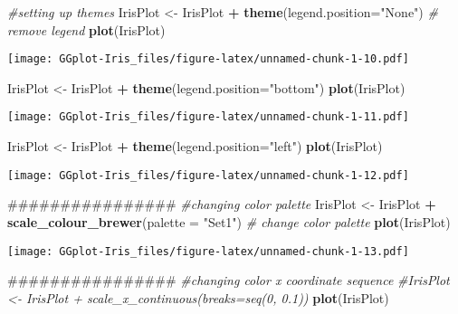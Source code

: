 \documentclass[]{article}
\newenvironment{Shaded}{\begin{snugshade}}{\end{snugshade}}
\newcommand{\KeywordTok}[1]{\textcolor[rgb]{0.13,0.29,0.53}{\textbf{#1}}}
\newcommand{\DataTypeTok}[1]{\textcolor[rgb]{0.13,0.29,0.53}{#1}}
\newcommand{\StringTok}[1]{\textcolor[rgb]{0.31,0.60,0.02}{#1}}
\newcommand{\CommentTok}[1]{\textcolor[rgb]{0.56,0.35,0.01}{\textit{#1}}}
\newcommand{\OperatorTok}[1]{\textcolor[rgb]{0.81,0.36,0.00}{\textbf{#1}}}
\newcommand{\NormalTok}[1]{#1}
\begin{document}
\begin{Shaded}
\begin{Highlighting}[]
\CommentTok{#setting up themes}
\NormalTok{IrisPlot <-}\StringTok{ }\NormalTok{IrisPlot }\OperatorTok{+}\StringTok{ }\KeywordTok{theme}\NormalTok{(}\DataTypeTok{legend.position=}\StringTok{"None"}\NormalTok{)  }\CommentTok{# remove legend}
\KeywordTok{plot}\NormalTok{(IrisPlot)}
\end{Highlighting}
\end{Shaded}

\texttt{[image: GGplot-Iris\_files/figure-latex/unnamed-chunk-1-10.pdf]}

\begin{Shaded}
\begin{Highlighting}[]
\NormalTok{IrisPlot <-}\StringTok{ }\NormalTok{IrisPlot }\OperatorTok{+}\StringTok{ }\KeywordTok{theme}\NormalTok{(}\DataTypeTok{legend.position=}\StringTok{"bottom"}\NormalTok{)}
\KeywordTok{plot}\NormalTok{(IrisPlot)}
\end{Highlighting}
\end{Shaded}

\texttt{[image: GGplot-Iris\_files/figure-latex/unnamed-chunk-1-11.pdf]}

\begin{Shaded}
\begin{Highlighting}[]
\NormalTok{IrisPlot <-}\StringTok{ }\NormalTok{IrisPlot }\OperatorTok{+}\StringTok{ }\KeywordTok{theme}\NormalTok{(}\DataTypeTok{legend.position=}\StringTok{"left"}\NormalTok{)}
\KeywordTok{plot}\NormalTok{(IrisPlot)}
\end{Highlighting}
\end{Shaded}

\texttt{[image: GGplot-Iris\_files/figure-latex/unnamed-chunk-1-12.pdf]}

\begin{Shaded}
\begin{Highlighting}[]
\NormalTok{################}
\CommentTok{#changing color palette}
\NormalTok{IrisPlot <-}\StringTok{ }\NormalTok{IrisPlot }\OperatorTok{+}\StringTok{ }\KeywordTok{scale_colour_brewer}\NormalTok{(}\DataTypeTok{palette =} \StringTok{"Set1"}\NormalTok{)  }\CommentTok{# change color palette}
\KeywordTok{plot}\NormalTok{(IrisPlot)}
\end{Highlighting}
\end{Shaded}

\texttt{[image: GGplot-Iris\_files/figure-latex/unnamed-chunk-1-13.pdf]}

\begin{Shaded}
\begin{Highlighting}[]
\NormalTok{################}
\CommentTok{#changing color x coordinate sequence}
\CommentTok{#IrisPlot  <- IrisPlot  + scale_x_continuous(breaks=seq(0, 0.1))}
\KeywordTok{plot}\NormalTok{(IrisPlot)}
\end{Highlighting}
\end{Shaded}
\end{document}
